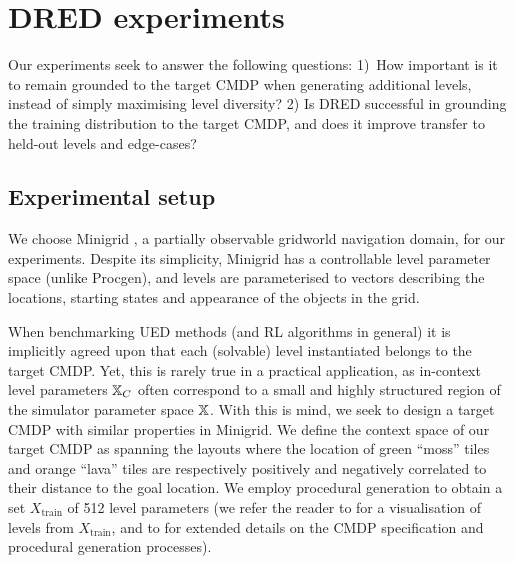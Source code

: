 \documentclass{article}
\theoremstyle{plain}
\theoremstyle{definition}
\theoremstyle{remark}
\begin{document}
\section{DRED experiments}\label{sec:minigrid}
Our experiments seek to answer the following questions: 1)~How important is it to remain grounded to the target CMDP when generating additional levels, instead of simply maximising level diversity? 2) Is DRED successful in grounding the training distribution to the target CMDP, and does it improve transfer to held-out levels and edge-cases?
\subsection{Experimental setup}
 We choose Minigrid \citep{gym_minigrid}, a partially observable gridworld navigation domain, for our experiments. Despite its simplicity, Minigrid has a controllable level parameter space (unlike Procgen), and levels are parameterised to vectors describing the locations, starting states and appearance of the objects in the grid. 
 
When benchmarking UED methods (and RL algorithms in general) it is implicitly agreed upon that each (solvable) level instantiated belongs to the target CMDP. Yet, this is rarely true in a practical application, as in-context level parameters ${\mathbb{X}}_C$ often correspond to a small and highly structured region of the simulator parameter space ${\mathbb{X}}$. With this is mind, we seek to design a target CMDP with similar properties in Minigrid. We define the context space of our target CMDP as spanning the layouts where the location of green ``moss'' tiles and orange ``lava'' tiles are respectively positively and negatively correlated to their distance to the goal location. 
We employ procedural generation to obtain a set $X_\text{train}$ of 512 level parameters (we refer the reader to  for a visualisation of levels from $X_\text{train}$, and to  for extended details on the CMDP specification and procedural generation processes).
\end{document}
